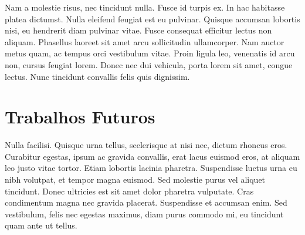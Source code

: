 Nam a molestie risus, nec tincidunt nulla. Fusce id turpis ex. In hac habitasse platea dictumst. Nulla eleifend feugiat est eu pulvinar. Quisque accumsan lobortis nisi, eu hendrerit diam pulvinar vitae. Fusce consequat efficitur lectus non aliquam. Phasellus laoreet sit amet arcu sollicitudin ullamcorper. Nam auctor metus quam, ac tempus orci vestibulum vitae. Proin ligula leo, venenatis id arcu non, cursus feugiat lorem. Donec nec dui vehicula, porta lorem sit amet, congue lectus. Nunc tincidunt convallis felis quis dignissim.

\section{Trabalhos Futuros}
\label{sec:trabalhos-futuros}

Nulla facilisi. Quisque urna tellus, scelerisque at nisi nec, dictum rhoncus eros. Curabitur egestas, ipsum ac gravida convallis, erat lacus euismod eros, at aliquam leo justo vitae tortor. Etiam lobortis lacinia pharetra. Suspendisse luctus urna eu nibh volutpat, et tempor magna euismod. Sed molestie purus vel aliquet tincidunt. Donec ultricies est sit amet dolor pharetra vulputate. Cras condimentum magna nec gravida placerat. Suspendisse et accumsan enim. Sed vestibulum, felis nec egestas maximus, diam purus commodo mi, eu tincidunt quam ante ut tellus.